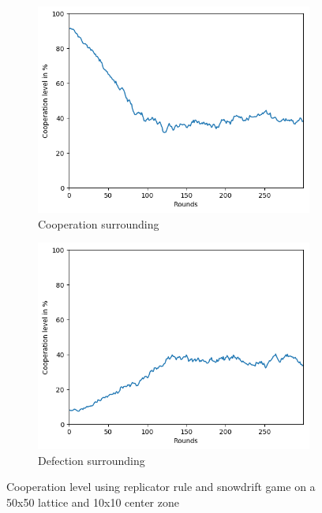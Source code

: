 \documentclass[letterpaper]{article}
\begin{document}
\begin{figure}[H]
    \begin{subfigure}{.5\textwidth}
        \centering
        \includegraphics[width=1\linewidth]
        {images/assign2/part32-coop/coop.png}
        \caption{Cooperation surrounding}
        \label{fig:part32-coop}
    \end{subfigure}
    \begin{subfigure}{.5\textwidth}
        \centering
        \includegraphics[width=1\linewidth]
        {images/assign2/part32-defect/coop.png}
        \caption{Defection surrounding}
        \label{fig:part32-coop}
    \end{subfigure}
    \caption{Cooperation level using replicator rule and
    snowdrift game on a 50x50 lattice and 10x10 center zone}
    \label{fig:50part2}
\end{figure}
\end{document}
